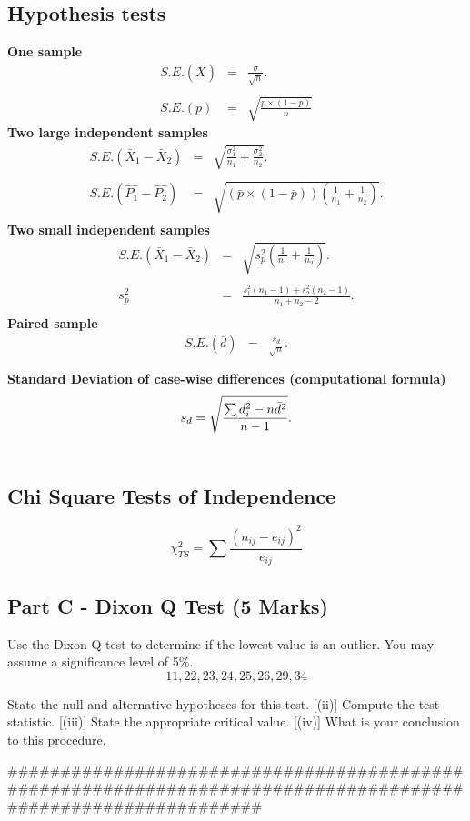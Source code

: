 \subsection*{Hypothesis tests}
{\bf One sample}
\begin{eqnarray*}
	S.E.(\bar{X})&=&\frac{\sigma}{\sqrt{n}}.\\\\
	S.E.(p)&=&\sqrt{\frac{p \times(1-p)}{n}}
\end{eqnarray*}
{\bf Two large independent samples}
\begin{eqnarray*}
	S.E.(\bar{X}_1-\bar{X}_2)&=&\sqrt{\frac{\sigma^2_1}{n_1}+\frac{\sigma_2^2}{n_2}}.\\\\
	S.E.(\hat{P_1}-\hat{P_2})&=&\sqrt{\left(\bar{p}\times(1-\bar{p})\right)\left(\frac{1}{n_1}+\frac{1}{n_2}\right)}.\\
\end{eqnarray*}
{\bf Two small independent samples}
\begin{eqnarray*}
	S.E.(\bar{X}_1-\bar{X}_2)&=&\sqrt{s_p^2\left(\frac{1}{n_1}+\frac{1}{n_2}\right)}.\\\\
	s_p^2&=&\frac{s_1^2(n_1-1)+s_2^2(n_2-1)}{n_1+n_2-2}.\\
\end{eqnarray*}
{\bf Paired sample}
\begin{eqnarray*}
	S.E.(\bar{d})&=&\frac{s_d}{\sqrt{n}}.\\\\
\end{eqnarray*}
{\bf Standard Deviation of case-wise differences (computational formula)}
\begin{eqnarray*}
	s_d = \sqrt{ {\sum d_i^2 - n\bar{d}^2 \over n-1}}.\\\\
\end{eqnarray*}
\subsection*{Chi Square Tests of Independence}
\[\chi^2_{TS} =  \sum \frac{(n_{ij} - e_{ij})^2}{e_{ij}}\]





\subsection*{Part C - Dixon Q Test (5 Marks)}

	
	Use the Dixon Q-test to determine if the lowest value is an outlier. You may assume a significance level of 5\%.
		\[ 11,22,23,24,25,26,29,34\]
	\begin{itemize}
	[(i)]	State the null and alternative hypotheses for this test.
	[(ii)] Compute the test statistic.
	[(iii)] State the appropriate critical value.
	[(iv)] What is your conclusion to this procedure.
	\end{itemize}
##############################################################################################################

